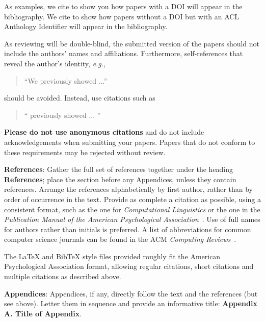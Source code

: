 \documentclass[11pt,a4paper]{article}
\begin{document}
As examples, we cite \cite{P16-1001} to show you how papers with a DOI
will appear in the bibliography.  We cite \cite{C14-1001} to show how
papers without a DOI but with an ACL Anthology Identifier will appear
in the bibliography.  

As reviewing will be double-blind, the submitted version of the papers
should not include the authors' names and affiliations. Furthermore,
self-references that reveal the author's identity, {\em e.g.},
\begin{quote}
``We previously showed \cite{Gusfield:97} ...''  
\end{quote}
should be avoided. Instead, use citations such as 
\begin{quote}
``\citeauthor{Gusfield:97} 
previously showed ... ''
\end{quote}

\textbf{Please do not use anonymous citations} and do not include
acknowledgements when submitting your papers. Papers that do not
conform to these requirements may be rejected without review.

\textbf{References}: Gather the full set of references together under
the heading {\bf References}; place the section before any Appendices,
unless they contain references. Arrange the references alphabetically
by first author, rather than by order of occurrence in the text.
Provide as complete a citation as possible, using a consistent format,
such as the one for {\em Computational Linguistics\/} or the one in the 
{\em Publication Manual of the American 
Psychological Association\/}~\cite{APA:83}.  Use of full names for
authors rather than initials is preferred.  A list of abbreviations
for common computer science journals can be found in the ACM 
{\em Computing Reviews\/}~\cite{ACM:83}.

The \LaTeX{} and Bib\TeX{} style files provided roughly fit the
American Psychological Association format, allowing regular citations, 
short citations and multiple citations as described above.

{\bf Appendices}: Appendices, if any, directly follow the text and the
references (but see above).  Letter them in sequence and provide an
informative title: {\bf Appendix A. Title of Appendix}.



%
%



\appendix
\end{document}
